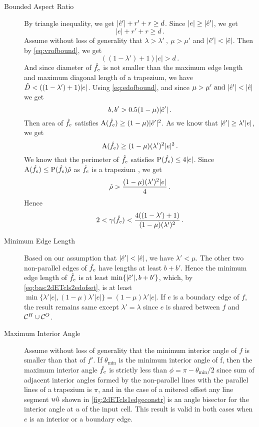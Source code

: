 \begin{description}
\item[Bounded Aspect Ratio]\label{bas:2dETcls2}
By triangle inequality, we get $|\hat{e}'| + r' + r \geq d$. 
Since $|e| \geq |\hat{e}'|$, we get
\[ |e| + r' + r \geq d \,. \]
Assume without loss of generality that $\lambda > \lambda'~,~ \mu > \mu'$  and  $|\hat{e}'| < |\hat{e}|$.
Then by \cref{eq:vrofbound}, we get
\begin{equation}
  ((1 - \lambda') + 1)|e| > d\,.   
\end{equation}
And since diameter of $\hat{f}_e$ is not smaller than the maximum edge length and maximum diagonal length of a trapezium, we have $\hat{D} < ((1 - \lambda') + 1)|e|$.
Using \cref{eq:edofbound}, and since $\mu > \mu' \text{ and } |\hat{e}'| < |\hat{e}| $ we get 
\begin{equation}\label{eq:bas:2dETcls2edofset}
  b, b' > 0.5(1 - \mu)|\hat{e}'| \,.   
\end{equation}
Then area of $\hat{f}_e$ satisfies $\operatorname{A}(\hat{f}_e) \geq (1 - \mu) |\hat{e}'|^2$.
As we know that $|\hat{e}'| \geq \lambda' |e| $, we get
\begin{equation}
    \operatorname{A}(\hat{f}_e) \geq (1 - \mu) (\lambda')^2 |e|^2 \, .
\end{equation}
We know that the perimeter of $\hat{f}_e$ satisfies $\operatorname{P}(\hat{f}_e) \leq 4|e|$.
Since $\operatorname{A}(\hat{f}_e) \leq \operatorname{P}(\hat{f}_e) \hat{\rho}$ as $\hat{f}_e$ is a trapezium \cite{ScAw2000}, we get
\begin{equation}
  \hat{\rho} > \frac{(1 - \mu ) (\lambda')^2 |e|}{4} \,.
\end{equation}
Hence
\begin{equation}
  2 < \gamma(\hat{f}_e) < \frac{4 ((1 - \lambda') + 1)}{(1 - \mu) (\lambda')^2}\, .    
\end{equation}
\item[Minimum Edge Length]\label{mel:2dETcls2}
  Based on our assumption that $|\hat{e}'| < |\hat{e}|$, we have $\lambda' < \mu$.
  The other two non-parallel edges of $\hat{f}_e$ have lengths at least $b + b'$.
  Hence the minimum edge length of $\hat{f}_e$ is at least $\min \{|\hat{e}'|, b+b' \}$, which, by \cref{eq:bas:2dETcls2edofset}, is at least $\min\{ \lambda' |e|, (1 - \mu)\lambda' |e|\} = (1 - \mu)\lambda' |e|$.
  If $e$ is a boundary edge of $f$, the result remains same except $\lambda' = \lambda$ since $e$ is shared between $f$ and $\mathcal{C}^H \cup \mathcal{C}^O$. 

\item[Maximum Interior Angle]\label{mia:2dETcls2}
  Assume without loss of generality that the minimum interior angle of $f$ is smaller than that of $f'$.
  If $\theta_{\min}$ is the minimum interior angle of f, then the maximum interior angle $\hat{f}_e$ is strictly less than $\phi =\pi - \theta_{\min}/2$ since sum of adjacent interior angles formed by the non-parallel lines with the parallel lines of a trapezium is $\pi$, and in the case of a mitered offset any line segment $u\hat{u}$ shown in \cref{fig:2dETcls1edgeconstr} is an angle bisector for the interior angle at $u$ of the input cell.
  This result is valid in both cases when $e$ is an interior or a boundary edge.
\end{description}

